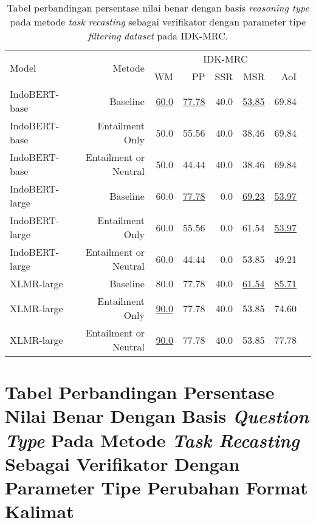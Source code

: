 \begin{table}[H]\centering
\begin{tabular}{lrrrrrrr}\toprule
\multirow{2}{*}{Model} &\multirow{2}{*}{Metode} &\multicolumn{5}{c}{IDK-MRC} \\\cmidrule{3-7}
& &WM &PP &SSR &MSR &AoI \\\midrule
IndoBERT-base &Baseline &\underline{60.0} &\underline{77.78} &40.0 &\underline{53.85} &69.84 \\
IndoBERT-base &Entailment Only &50.0 &55.56 &40.0 &38.46 &69.84 \\
IndoBERT-base &Entailment or Neutral &50.0 &44.44 &40.0 &38.46 &69.84 \\
\hline
IndoBERT-large &Baseline &60.0 &\underline{77.78} &0.0 &\underline{69.23} &\underline{53.97} \\
IndoBERT-large &Entailment Only &60.0 &55.56 &0.0 &61.54 &\underline{53.97} \\
IndoBERT-large &Entailment or Neutral &60.0 &44.44 &0.0 &53.85 &49.21 \\
\hline
XLMR-large &Baseline &80.0 &77.78 &40.0 &\underline{61.54} &\underline{85.71} \\
XLMR-large &Entailment Only &\underline{90.0} &77.78 &40.0 &53.85 &74.60 \\
XLMR-large &Entailment or Neutral &\underline{90.0} &77.78 &40.0 &53.85 &77.78 \\
\bottomrule
\end{tabular}
\caption{Tabel perbandingan persentase nilai benar dengan basis \emph{reasoning type} pada metode \emph{task recasting} sebagai verifikator dengan parameter tipe \emph{filtering} \emph{dataset} pada IDK-MRC.}
\end{table}

\section*{Tabel Perbandingan Persentase Nilai Benar Dengan Basis \emph{Question Type} Pada Metode \emph{Task Recasting} Sebagai Verifikator Dengan Parameter Tipe Perubahan Format Kalimat}

